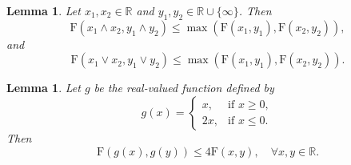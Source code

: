 \documentclass[12pt,reqno,a4paper]{amsart}
\newtheorem{lem}[prop]{Lemma}
\newcommand{\FF}{\mathrm{F}}
\numberwithin{equation}{section}
\begin{document}
\begin{lem}\label{min-max}
	Let \( x_1, x_2 \in \mathbb{R} \) and \( y_1, y_2 \in \mathbb{R} \cup \{\infty\} \). Then 
	\[
	\FF(x_1 \wedge x_2, y_1 \wedge y_2) \leq \max\left(\FF(x_1, y_1), \FF(x_2, y_2)\right),
	\]
	and
	\[
	\FF(x_1 \vee x_2, y_1 \vee y_2) \leq \max\left(\FF(x_1, y_1), \FF(x_2, y_2)\right).
	\]
\end{lem}

\begin{lem}\label{RS2}
	Let \( g \) be the real-valued function defined by
	\[
	g(x) =
	\begin{cases} 
		x, & \text{if } x \geq 0, \\ 
		2x, & \text{if } x \leq 0.
	\end{cases}
	\]
	Then
	\[
	\FF(g(x), g(y)) \leq 4 \FF(x, y), \quad \forall x, y \in \mathbb{R}.
	\]
\end{lem}
\end{document}
